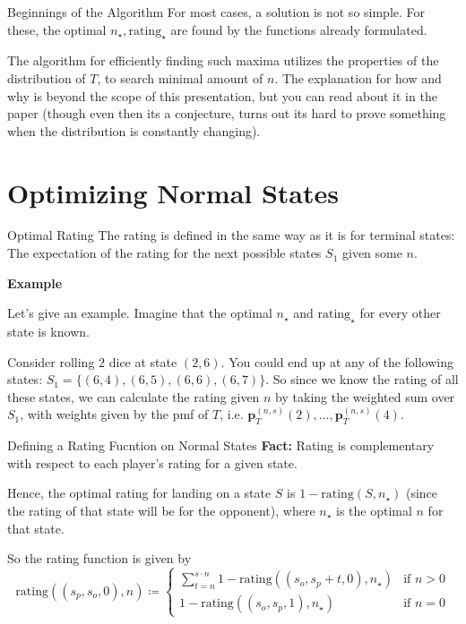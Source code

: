 \documentclass{beamer}
\begin{document}
\begin{frame}{Beginnings of the Algorithm}
    For most cases, a solution is not so simple. For these, the optimal $n_{\star}, \text{rating}_{\star}$ are found by the functions already formulated. 

    The algorithm for efficiently finding such maxima utilizes the properties of the distribution of $T$, to search minimal amount of $n$. The explanation for how and why is beyond the scope of this presentation, but you can read about it in the paper (though even then its a conjecture, turns out its hard to prove something when the distribution is constantly changing).
\end{frame}

\section{Optimizing Normal States}

\begin{frame}{Optimal Rating}
    The rating is defined in the same way as it is for terminal states: The expectation of the rating for the next possible states $S_1$ given some $n$. 

    \textbf{Example}

    Let's give an example. Imagine that the optimal $n_{\star}$ and $\text{rating}_{\star}$ for every other state is known. 

    Consider rolling $2$ dice at state $(2, 6)$. You could end up at any of the following states: $S_1 = \{(6, 4), (6,5), (6,6), (6,7)\}$. So since we know the rating of all these states, we can calculate the rating given $n$ by taking the weighted sum over $S_1$, with weights given by the pmf of $T$, i.e. $\textbf{p}_{T}^{(n, s)}(2), \ldots, \textbf{p}_{T}^{(n, s)}(4)$.
\end{frame}

\begin{frame}{Defining a Rating Fucntion on Normal States}
    \textbf{Fact:} Rating is complementary with respect to each player's rating for a given state.

    Hence, the optimal rating for landing on a state $S$ is $1-\text{rating}(S, n_{\star})$ (since the rating of that state will be for the opponent), where $n_{\star}$ is the optimal $n$ for that state. 


    So the rating function is given by
    \begin{equation}
        \text{rating}((s_p, s_o, 0), n) \coloneqq \begin{cases}
            \sum_{t = n}^{s \cdot n} 1 - \text{rating}((s_o, s_p + t, 0), n_{\star}) & \text{if } n > 0 \\
            1- \text{rating}((s_o, s_p, 1), n_{\star}) & \text{if } n = 0
        \end{cases}
    \end{equation}
\end{frame}
\end{document}
